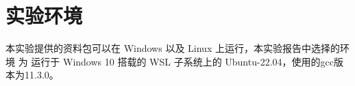 \section{实验环境}

本实验提供的资料包可以在 Windows 以及 Linux 上运行，本实验报告中选择的环境
为 运行于 Windows 10 搭载的 WSL 子系统上的 Ubuntu-22.04，使用的gcc版本为11.3.0。